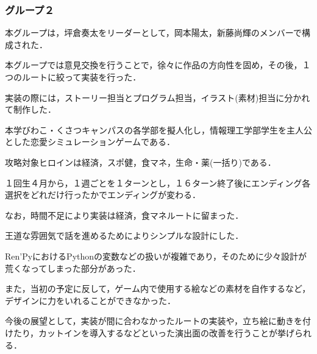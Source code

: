 \subsubsection{グループ２}

    本グループは，坪倉奏太をリーダーとして，岡本陽太，新藤尚輝のメンバーで構成された．


        本グループでは意見交換を行うことで，徐々に作品の方向性を固め，その後，１つのルートに絞って実装を行った．
        
        実装の際には，ストーリー担当とプログラム担当，イラスト(素材)担当に分かれて制作した．


        本学びわこ・くさつキャンパスの各学部を擬人化し，情報理工学部学生を主人公とした恋愛シミュレーションゲームである．

        攻略対象ヒロインは経済，スポ健，食マネ，生命・薬(一括り)である．
        
        １回生４月から，１週ごとを１ターンとし，１６ターン終了後にエンディング各選択をどれだけ行ったかでエンディングが変わる．

        なお，時間不足により実装は経済，食マネルートに留まった．
      

        王道な雰囲気で話を進めるためによりシンプルな設計にした．


        Ren'PyにおけるPythonの変数などの扱いが複雑であり，そのために少々設計が荒くなってしまった部分があった．

        また，当初の予定に反して，ゲーム内で使用する絵などの素材を自作するなど，デザインに力をいれることができなかった．


        今後の展望として，実装が間に合わなかったルートの実装や，立ち絵に動きを付けたり，カットインを導入するなどといった演出面の改善を行うことが挙げられる．
